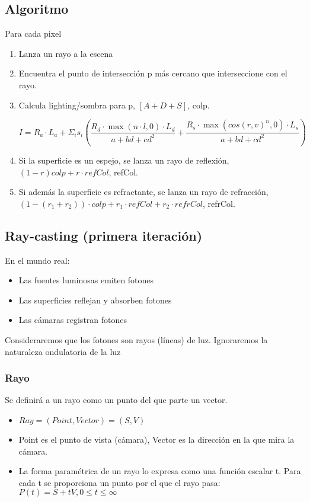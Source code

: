 \subsection{Algoritmo}
Para cada pixel
\begin{enumerate}
	\item Lanza un rayo a la escena
	\item Encuentra el punto de intersección p más cercano que interseccione con el rayo.
	\item Calcula lighting/sombra para p, $[A+D+S]$, colp.
	      
	      $$I= R_a \cdot L_a + \Sigma_i s_i \left( \frac {R_d \cdot \max (n\cdot l,0) \cdot L_d}{a+bd+cd^2} + \frac {R_s \cdot \max (cos(r,v)^n,0) \cdot L_s}{a+bd+cd^2} \right)$$
	\item Si la superficie es un espejo, se lanza un rayo de reflexión, $(1-r)colp+ r\cdot refCol$, refCol.
	\item Si además la superficie es refractante, se lanza un rayo de refracción, $(1-(r_1+r_2))\cdot colp + r_1\cdot refCol +r_2\cdot refrCol$, refrCol.
\end{enumerate}
\subsection{Ray-casting (primera iteración)}
En el mundo real:
\begin{itemize}
	\item Las fuentes luminosas emiten fotones
	\item Las superficies reflejan y absorben fotones
	\item Las cámaras registran fotones
\end{itemize}

Consideraremos que los fotones son rayos (líneas) de luz. Ignoraremos la naturaleza ondulatoria de la luz

\subsubsection{Rayo}
Se definirá a un rayo como un punto del que parte un vector.
\begin{itemize}
	\item $Ray = (Point, Vector) = (S, V)$
	\item Point es el punto de vista (cámara), Vector es la dirección en la que mira la cámara.
	\item La forma paramétrica de un rayo lo expresa como una función escalar t. Para cada t se proporciona un punto por el que el rayo pasa: $P(t)=S+tV, 0 \leq t \leq \infty$
\end{itemize}

